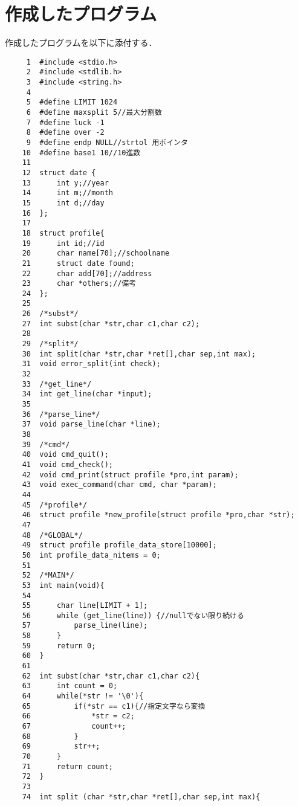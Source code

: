 \documentclass[a4j,11pt]{jarticle}
\begin{document}
\section{作成したプログラム}\label{sec:program}

作成したプログラムを以下に添付する．

%
%
{\fontsize{10pt}{11pt} \selectfont
\begin{verbatim}
     1  #include <stdio.h>
     2  #include <stdlib.h>
     3  #include <string.h>
     4
     5  #define LIMIT 1024
     6  #define maxsplit 5//最大分割数
     7  #define luck -1
     8  #define over -2
     9  #define endp NULL//strtol 用ポインタ
    10  #define base1 10//10進数
    11
    12  struct date {
    13      int y;//year
    14      int m;//month
    15      int d;//day
    16  };
    17
    18  struct profile{
    19      int id;//id
    20      char name[70];//schoolname
    21      struct date found;
    22      char add[70];//address
    23      char *others;//備考
    24  };
    25
    26  /*subst*/
    27  int subst(char *str,char c1,char c2);
    28
    29  /*split*/
    30  int split(char *str,char *ret[],char sep,int max);
    31  void error_split(int check);
    32
    33  /*get_line*/
    34  int get_line(char *input);
    35
    36  /*parse_line*/
    37  void parse_line(char *line);
    38
    39  /*cmd*/
    40  void cmd_quit();
    41  void cmd_check();
    42  void cmd_print(struct profile *pro,int param);
    43  void exec_command(char cmd, char *param);
    44
    45  /*profile*/
    46  struct profile *new_profile(struct profile *pro,char *str);
    47
    48  /*GLOBAL*/
    49  struct profile profile_data_store[10000];
    50  int profile_data_nitems = 0;
    51
    52  /*MAIN*/
    53  int main(void){
    54
    55      char line[LIMIT + 1];
    56      while (get_line(line)) {//nullでない限り続ける
    57          parse_line(line);
    58      }
    59      return 0;
    60  }
    61
    62  int subst(char *str,char c1,char c2){
    63      int count = 0;
    64      while(*str != '\0'){
    65          if(*str == c1){//指定文字なら変換
    66              *str = c2;
    67              count++;
    68          }
    69          str++;
    70      }
    71      return count;
    72  }
    73
    74  int split (char *str,char *ret[],char sep,int max){

\end{verbatim}}
\end{document}
